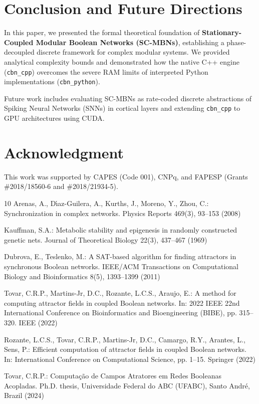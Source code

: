\documentclass{svproc}
\begin{document}
\section{Conclusion and Future Directions}
In this paper, we presented the formal theoretical foundation of \textbf{Stationary-Coupled Modular Boolean Networks (SC-MBNs)}, establishing a phase-decoupled discrete framework for complex modular systems. We provided analytical complexity bounds and demonstrated how the native C++ engine (\texttt{cbn\_cpp}) overcomes the severe RAM limits of interpreted Python implementations (\texttt{cbn\_python}).

Future work includes evaluating SC-MBNs as rate-coded discrete abstractions of Spiking Neural Networks (SNNs) in cortical layers and extending \texttt{cbn\_cpp} to GPU architectures using CUDA.

\section*{Acknowledgment}
This work was supported by CAPES (Code 001), CNPq, and FAPESP (Grants \#2018/18560-6 and \#2018/21934-5).


\begin{thebibliography}{10}
Arenas, A., D{\'\i}az-Guilera, A., Kurths, J., Moreno, Y., Zhou, C.: Synchronization in complex networks. Physics Reports 469(3), 93--153 (2008)

Kauffman, S.A.: Metabolic stability and epigenesis in randomly constructed genetic nets. Journal of Theoretical Biology 22(3), 437--467 (1969)

Dubrova, E., Teslenko, M.: A SAT-based algorithm for finding attractors in synchronous Boolean networks. IEEE/ACM Transactions on Computational Biology and Bioinformatics 8(5), 1393--1399 (2011)

Tovar, C.R.P., Martins-Jr, D.C., Rozante, L.C.S., Araujo, E.: A method for computing attractor fields in coupled Boolean networks. In: 2022 IEEE 22nd International Conference on Bioinformatics and Bioengineering (BIBE), pp. 315--320. IEEE (2022)

Rozante, L.C.S., Tovar, C.R.P., Martins-Jr, D.C., Camargo, R.Y., Arantes, L., Sens, P.: Efficient computation of attractor fields in coupled Boolean networks. In: International Conference on Computational Science, pp. 1--15. Springer (2022)

Tovar, C.R.P.: Computa{\c{c}}{\~a}o de Campos Atratores em Redes Booleanas Acopladas. Ph.D. thesis, Universidade Federal do ABC (UFABC), Santo Andr{\'e}, Brazil (2024)

\end{thebibliography}
\end{document}
